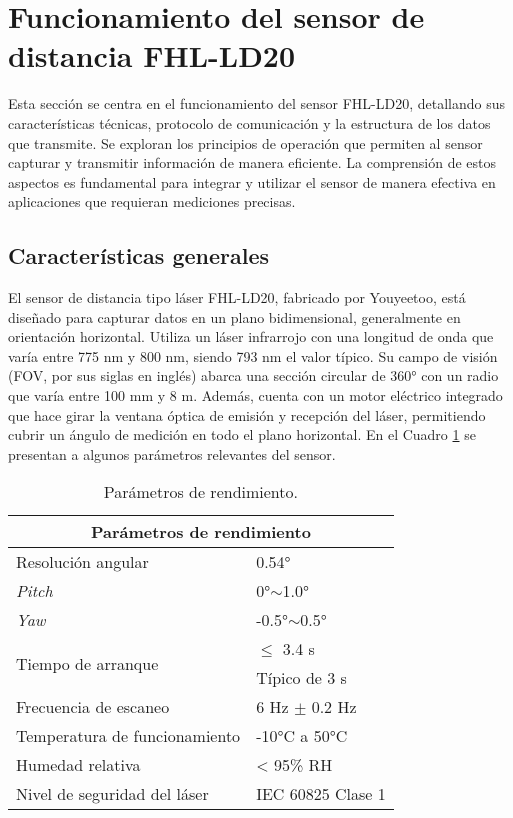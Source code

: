 \section{Funcionamiento del sensor de distancia FHL-LD20}
Esta sección se centra en el funcionamiento del sensor FHL-LD20, detallando sus características técnicas, protocolo de comunicación y la estructura de los datos que transmite. Se exploran los principios de operación que permiten al sensor capturar y transmitir información de manera eficiente. La comprensión de estos aspectos es fundamental para integrar y utilizar el sensor de manera efectiva en aplicaciones que requieran mediciones precisas. 
\subsection{Características generales}
El sensor de distancia tipo láser FHL-LD20, fabricado por Youyeetoo, está diseñado para capturar datos en un plano bidimensional, generalmente en orientación horizontal. Utiliza un láser infrarrojo con una longitud de onda que varía entre 775 nm y 800 nm, siendo 793 nm el valor típico. Su campo de visión (FOV, por sus siglas en inglés) abarca una sección circular de 360° con un radio que varía entre 100 mm y 8 m. Además, cuenta con un motor eléctrico integrado que hace girar la ventana óptica de emisión y recepción del láser, permitiendo cubrir un ángulo de medición en todo el plano horizontal. En el Cuadro \ref{cuadro:parametrosrendi} se presentan a algunos parámetros relevantes del sensor.

\begin{table}[H]
	\centering
	\begin{tabular}{|l|l|} 
		\hline
		\multicolumn{2}{|c|}{Parámetros de rendimiento}\\
		\hline
		\multicolumn{1}{|l|}{Resolución angular}& 0.54°\\
		\hline
		\multicolumn{1}{|l|}{\textit{Pitch}}& 0°$\sim$1.0°\\
		\hline		
		\multicolumn{1}{|l|}{\textit{Yaw}}& -0.5°$\sim$0.5°\\
		\hline
		\multirow{2}{*}{Tiempo de arranque}&$\leq$ 3.4 s\\
		&Típico de 3 s\\
		\hline
		\multicolumn{1}{|l|}{Frecuencia de escaneo}& 6 Hz $\pm$ 0.2 Hz\\
		\hline
		\multicolumn{1}{|l|}{Temperatura de funcionamiento}& -10°C a 50°C\\
		\hline
		\multicolumn{1}{|l|}{Humedad relativa}& < 95\% RH\\
		\hline
		\multicolumn{1}{|l|}{Nivel de seguridad del láser}& IEC 60825 Clase 1\\
		\hline
	\end{tabular}
	\caption{Parámetros de rendimiento.} 
	\label{cuadro:parametrosrendi}
\end{table}

